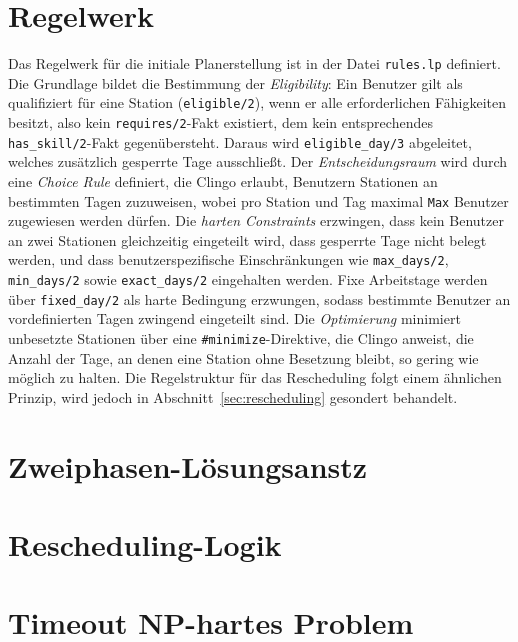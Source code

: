 \section{Regelwerk}
Das Regelwerk für die initiale Planerstellung ist in der Datei \texttt{rules.lp} 
definiert. Die Grundlage bildet die Bestimmung der \textit{Eligibility}: Ein 
Benutzer gilt als qualifiziert für eine Station (\texttt{eligible/2}), wenn er 
alle erforderlichen Fähigkeiten besitzt, also kein \texttt{requires/2}-Fakt 
existiert, dem kein entsprechendes \texttt{has\_skill/2}-Fakt gegenübersteht. 
Daraus wird \texttt{eligible\_day/3} abgeleitet, welches zusätzlich gesperrte 
Tage ausschließt. Der \textit{Entscheidungsraum} wird durch eine \textit{Choice 
	Rule} definiert, die Clingo erlaubt, Benutzern Stationen an bestimmten Tagen 
zuzuweisen, wobei pro Station und Tag maximal \texttt{Max} Benutzer zugewiesen 
werden dürfen. Die \textit{harten Constraints} erzwingen, dass kein Benutzer an 
zwei Stationen gleichzeitig eingeteilt wird, dass gesperrte Tage nicht belegt 
werden, und dass benutzerspezifische Einschränkungen wie \texttt{max\_days/2}, 
\texttt{min\_days/2} sowie \texttt{exact\_days/2} eingehalten werden. Fixe 
Arbeitstage werden über \texttt{fixed\_day/2} als harte Bedingung erzwungen, 
sodass bestimmte Benutzer an vordefinierten Tagen zwingend eingeteilt sind. 
Die \textit{Optimierung} minimiert unbesetzte Stationen über eine 
\texttt{\#minimize}-Direktive, die Clingo anweist, die Anzahl der Tage, an 
denen eine Station ohne Besetzung bleibt, so gering wie möglich zu halten. 
Die Regelstruktur für das Rescheduling folgt einem ähnlichen Prinzip, wird 
jedoch in Abschnitt~\ref{sec:rescheduling} gesondert behandelt.
\section{Zweiphasen-Lösungsanstz}

\section{Rescheduling-Logik}

\section{Timeout NP-hartes Problem}



